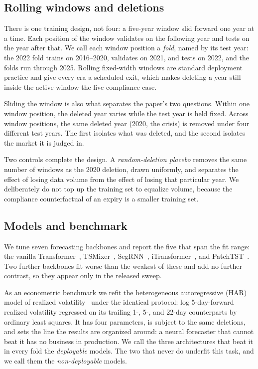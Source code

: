 \subsection{Rolling windows and deletions}

There is one training design, not four: a five-year window slid
forward one year at a time. Each position of the window validates
on the following year and tests on the year after that. We call
each window position a \emph{fold}, named by its test year: the
2022 fold trains on 2016--2020, validates on 2021, and tests on
2022, and the folds run through 2025. Rolling fixed-width windows
are standard deployment practice and give every era a scheduled
exit, which makes deleting a year still inside the active window
the live compliance case.

Sliding the window is also what separates the paper's two questions.
Within one window position, the deleted year varies while the test
year is held fixed. Across window positions, the same deleted year
(2020, the crisis) is removed under four different test years. The
first isolates what was deleted, and the second isolates the market
it is judged in.

Two controls complete the design. A \emph{random-deletion placebo}
removes the same number of windows as the 2020 deletion, drawn
uniformly, and separates the effect of losing data volume from the
effect of losing that particular year. We deliberately do not top up
the training set to equalize volume, because the compliance
counterfactual of an expiry is a smaller training set.

\subsection{Models and benchmark}

We tune seven forecasting backbones and report the five that span the
fit range: the vanilla Transformer~\cite{vaswani2017attention},
TSMixer~\cite{chen2023tsmixer}, SegRNN~\cite{lin2023segrnn},
iTransformer~\cite{liu2024itransformer}, and
PatchTST~\cite{nie2023patchtst}. Two further backbones fit worse
than the weakest of these and add no further contrast, so they
appear only in the released sweep.

As an econometric benchmark we refit the heterogeneous autoregressive
(HAR) model of realized volatility~\cite{corsi2009har} under the
identical protocol: log 5-day-forward realized volatility regressed
on its trailing 1-, 5-, and 22-day counterparts by ordinary least
squares. It has four parameters, is subject to the same deletions,
and sets the line the results are organized around: a neural
forecaster that cannot beat it has no business in production. We call
the three architectures that beat it in every fold the
\emph{deployable} models. The two that never do underfit this task,
and we call them the \emph{non-deployable} models.

